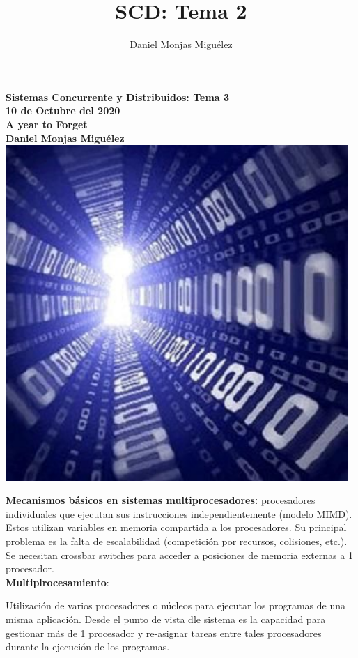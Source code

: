 \documentclass[a4paper,11pt]{article}
\author{Daniel Monjas Miguélez}
\title{SCD: Tema 2}
\begin{document}
\begin{titlepage}
\centering
    \vfill
    {\bfseries\Large
        Sistemas Concurrente y Distribuidos: Tema 3\\
        10 de Octubre del 2020\\
        A year to Forget \\
        \vskip2cm
        Daniel Monjas Miguélez\\
    }    
    \vfill
    \includegraphics[width=13cm]{binario.jpg}
    \vfill
    \vfill
\end{titlepage}

\newpage
\tableofcontents
\newpage

\textbf{Mecanismos básicos en sistemas multiprocesadores:} procesadores individuales que ejecutan sus instrucciones independientemente (modelo MIMD). Estos utilizan variables en memoria compartida a los procesadores. Su principal problema es la falta de escalabilidad (competición por recursos, colisiones, etc.). Se necesitan crossbar switches para acceder a posiciones de memoria externas a 1 procesador. \\

\textbf{Multiplrocesamiento}:

Utilización de varios procesadores o núcleos para ejecutar los programas de una misma aplicación. Desde el punto de vista dle sistema es la capacidad para gestionar más de 1 procesador y re-asignar tareas entre tales procesadores durante la ejecución de los programas. \\
\end{document}
